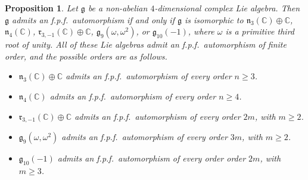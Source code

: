 \documentclass[12pt]{amsart}
\newtheorem{prop}[thm]{Proposition}
\theoremstyle{definition}
\theoremstyle{remark}
\newcommand{\C}{\mathbb{C}}
\newcommand{\Lg}{\mathfrak{g}}
\newcommand{\Ln}{\mathfrak{n}}
\newcommand{\Lr}{\mathfrak{r}}
\newcommand{\om}{\omega}
\begin{document}
\begin{prop}\label{4.3}
Let $\Lg$ be a non-abelian $4$-dimensional complex Lie algebra. Then
$\Lg$ admits an f.p.f.\ automorphism if and only if $\Lg$ is isomorphic to $\Ln_3(\C)\oplus \C$, $\Ln_4(\C)$,
$\Lr_{3,-1}(\C)\oplus \C$, $\Lg_9(\om,\om^2)$, or $\Lg_{10}(-1)$, where $\om$ is a primitive third root of unity.
All of these Lie algebras admit an f.p.f.\ automorphism of finite order, and
the possible orders are as follows.
\begin{itemize}
\item[(1)] $\Ln_3(\C)\oplus \C$ admits an f.p.f.\ automorphism of every order $n\ge 3$.
\item[(2)] $\Ln_4(\C)$ admits an f.p.f.\ automorphism  of every order $n\ge 4$.
\item[(3)] $\Lr_{3,-1}(\C)\oplus \C$ admits an f.p.f.\ automorphism of every order $2m$, with $m\ge 2$.
\item[(4)] $\Lg_9(\om,\om^2)$ admits an f.p.f.\ automorphism of every order $3m$, with $m\ge 2$.
\item[(5)] $\Lg_{10}(-1)$ admits an f.p.f.\ automorphism of every order order $2m$, with $m\ge 3$.
\end{itemize}
\end{prop}
\end{document}
